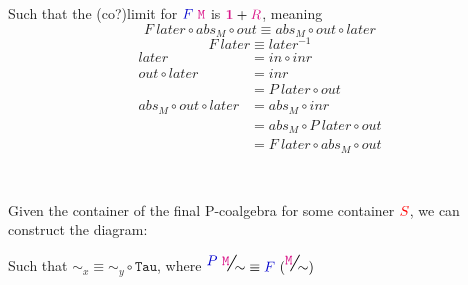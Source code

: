 \documentclass[twoside,11pt,openright]{report}
\newcommand*{\term}[1]{\textcolor{blue!80!black}{#1}}
\newcommand*{\type}[1]{\textcolor{magenta!90!black}{#1}}
\newcommand*{\container}[1]{\textcolor{red}{#1}}
\newcommand*{\unit}{\type{\textbf{1}}}
\newcommand*{\ssfrac}[2]{ {\LARGE \text{\sfrac{\ensuremath{#1}}{\ensuremath{#2}}}}}
\begin{document}
\begin{figure}[h]
  \centering
\end{figure}
\noindent Such that the (co?)limit for \(\term{F}~\type{\texttt{M}}\) is \(\unit + \type{R}\), meaning
\begin{equation}
  F~later \circ abs_M \circ out \equiv abs_M \circ out \circ later
\end{equation}
\begin{equation}
  F~later \equiv later^{-1}
\end{equation}
\begin{align}
  later &= in \circ inr \\
  out \circ later &= inr \\
        &= P~later \circ out \\
  abs_{M} \circ out \circ later &= abs_{M} \circ inr \\
        &= abs_M \circ P~later \circ out\\
        &= F~later \circ abs_M \circ out\\
\end{align}
\\ \\
Given the container of the final P-coalgebra for some container \(\container{S}\), we can construct the diagram:

\begin{figure}[h]
  \centering
\end{figure}
\noindent Such that \(\sim_x \equiv \sim_y \circ \mathtt{Tau}\), where \(\ssfrac{\term{P}~\type{\texttt{M}}}{\sim} \equiv \term{F}~(\ssfrac{\type{\texttt{M}}}{\sim})\)
\end{document}
